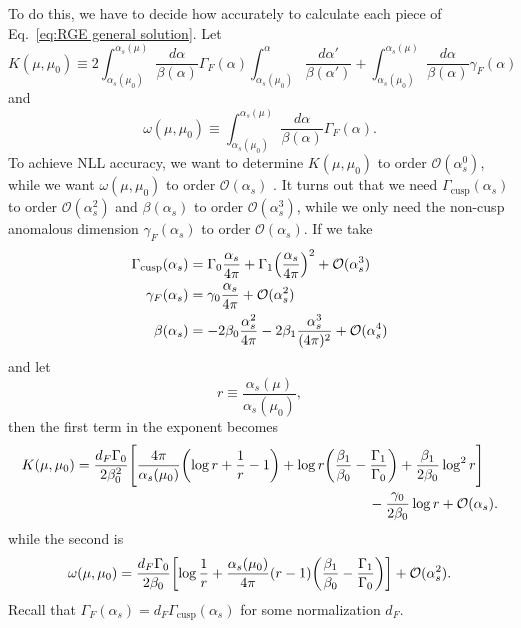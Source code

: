 \documentclass[12pt,twoside,class=../reedthesis, crop=false]{standalone}
\providecommand{\cusp}{\mathrm{cusp}}
\providecommand{\cO}{\mathcal{O}}
\begin{document}
	To do this, we have to decide how accurately to calculate each piece of Eq.~\ref{eq:RGE general solution}. Let
	\begin{equation}
		K(\mu, \mu_0) \equiv 2 \int_{\alpha_s(\mu_0)}^{\alpha_s(\mu)} \frac{d\alpha}{\beta(\alpha)}\Gamma_F(\alpha) \int_{\alpha_s(\mu_0)}^\alpha \frac{d\alpha'}{\beta(\alpha')} + \int_{\alpha_s(\mu_0)}^{\alpha_s(\mu)} \frac{d\alpha}{\beta(\alpha)}\gamma_F(\alpha)
	\end{equation}
	and
	\begin{equation}
		\omega(\mu, \mu_0) \equiv \int_{\alpha_s(\mu_0)}^{\alpha_s(\mu)} \frac{d\alpha}{\beta(\alpha)}\Gamma_F(\alpha).
	\end{equation}
	To achieve NLL accuracy, we want to determine $K(\mu, \mu_0)$ to order $\cO(\alpha_s^0)$, while we want $\omega(\mu, \mu_0)$ to order $\cO(\alpha_s)$ \cite{frye_factorization_2016}. It turns out that we need $\Gamma_\cusp(\alpha_s)$ to order $\cO(\alpha_s^2)$ and $\beta(\alpha_s)$ to order $\cO(\alpha_s^3)$, while we only need the non-cusp anomalous dimension $\gamma_F(\alpha_s)$ to order $\cO(\alpha_s)$. If we take
	\begin{align}
		\Gamma_\cusp(\alpha_s) &= \Gamma_0 \frac{\alpha_s}{4\pi} + \Gamma_1 \qty(\frac{\alpha_s}{4\pi})^2 + \cO(\alpha_s^3) \\
		\gamma_F(\alpha_s) &= \gamma_0 \frac{\alpha_s}{4\pi} + \cO(\alpha_s^2) \\
		\beta(\alpha_s) &= -2\beta_0 \frac{\alpha_s^2}{4\pi} - 2\beta_1 \frac{\alpha_s^3}{(4\pi)^2} + \cO(\alpha_s^4)
	\end{align}
	and let
	\begin{equation}
		r \equiv \frac{\alpha_s(\mu)}{\alpha_s(\mu_0)},
	\end{equation}
	then the first term in the exponent becomes
	\begin{equation}
	\begin{aligned}
		K(\mu, \mu_0) = \frac{d_F \Gamma_0}{2\beta_0^2}\Bigg[\frac{4\pi}{\alpha_s(\mu_0)} \qty(\log r + \frac{1}{r} - 1) + \log r \qty(\frac{\beta_1}{\beta_0} - \frac{\Gamma_1}{\Gamma_0}) &+ \frac{\beta_1}{2\beta_0}\log^2 r \Bigg] \\
		&\hspace{-0.75cm}- \frac{\gamma_0}{2\beta_0} \log r + \cO(\alpha_s).
	\end{aligned}
	\end{equation}
	while the second is
	\begin{equation}
		\omega(\mu, \mu_0) = \frac{d_F \Gamma_0}{2\beta_0}\qty[\log \frac{1}{r} + \frac{\alpha_s(\mu_0)}{4\pi}(r - 1)\qty(\frac{\beta_1}{\beta_0} - \frac{\Gamma_1}{\Gamma_0})] + \cO(\alpha_s^2).
	\end{equation}
	Recall that $\Gamma_F(\alpha_s) = d_F \Gamma_\cusp(\alpha_s)$ for some normalization $d_F$.
\end{document}
